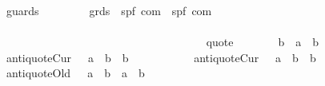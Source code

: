 \begin{isabellebody}
\ \ {\isachardoublequoteopen}{\isacharunderscore}guards{\isachardoublequoteclose}\ \ \ \ \ \ \ \ {\isacharcolon}{\isacharcolon}\ {\isachardoublequoteopen}grds\ {\isasymRightarrow}\ {\isacharparenleft}{\isacharprime}s{\isacharcomma}{\isacharprime}p{\isacharcomma}{\isacharprime}f{\isacharparenright}\ com\ {\isasymRightarrow}\ {\isacharparenleft}{\isacharprime}s{\isacharcomma}{\isacharprime}p{\isacharcomma}{\isacharprime}f{\isacharparenright}\ com{\isachardoublequoteclose}\ \isanewline
\ \ \ \ \ \ \ \ \ \ \ \ \ \ \ \ \ \ \ \ \ \ \ \ \ \ \ \ \ \ \ \ \ \ \ \ \ \ \ \ \ \ \ \ {\isacharparenleft}{\isachardoublequoteopen}{\isacharparenleft}{\isacharunderscore}{\isacharslash}{\isasymlongmapsto}\ {\isacharunderscore}{\isacharparenright}{\isachardoublequoteclose}\ {\isacharbrackleft}{}{}{\isacharcomma}\ {}{}{\isacharbrackright}\ {}{}{\isacharparenright}\ \ \ \ \ \ \ \ \ \ \ \ \ \ \ \ \ \ \ \ \ \ \ \ \ \ \ \ \ \ \ \ \ \ \ \ \ \ \ \ \ \ \ \ \ \ \ \ \ \ \ \ \ \ \ \ \ \ \ \isanewline
\ \ {\isachardoublequoteopen}{\isacharunderscore}quote{\isachardoublequoteclose}\ \ \ \ \ \ \ {\isacharcolon}{\isacharcolon}\ {\isachardoublequoteopen}{\isacharprime}b\ {\isacharequal}{\isachargreater}\ {\isacharparenleft}{\isacharprime}a\ {\isacharequal}{\isachargreater}\ {\isacharprime}b{\isacharparenright}{\isachardoublequoteclose}\isanewline
\ \ {\isachardoublequoteopen}{\isacharunderscore}antiquoteCur{}{\isachardoublequoteclose}\ \ {\isacharcolon}{\isacharcolon}\ {\isachardoublequoteopen}{\isacharparenleft}{\isacharprime}a\ {\isacharequal}{\isachargreater}\ {\isacharprime}b{\isacharparenright}\ {\isacharequal}{\isachargreater}\ {\isacharprime}b{\isachardoublequoteclose}\ \ \ \ \ \ \ {\isacharparenleft}{\isachardoublequoteopen}{\isasymacute}{\isacharunderscore}{\isachardoublequoteclose}\ {\isacharbrackleft}{}{}{}{}{\isacharbrackright}\ {}{}{}{}{\isacharparenright}\isanewline
\ \ {\isachardoublequoteopen}{\isacharunderscore}antiquoteCur{\isachardoublequoteclose}\ \ {\isacharcolon}{\isacharcolon}\ {\isachardoublequoteopen}{\isacharparenleft}{\isacharprime}a\ {\isacharequal}{\isachargreater}\ {\isacharprime}b{\isacharparenright}\ {\isacharequal}{\isachargreater}\ {\isacharprime}b{\isachardoublequoteclose}\isanewline
\ \ {\isachardoublequoteopen}{\isacharunderscore}antiquoteOld{}{\isachardoublequoteclose}\ \ {\isacharcolon}{\isacharcolon}\ {\isachardoublequoteopen}{\isacharparenleft}{\isacharprime}a\ {\isacharequal}{\isachargreater}\ {\isacharprime}b{\isacharparenright}\ {\isacharequal}{\isachargreater}\ {\isacharprime}a\ {\isacharequal}{\isachargreater}\ {\isacharprime}b{\isachardoublequoteclose}\ \ \ \ \ \ \ {\isacharparenleft}{\isachardoublequoteopen}\isactrlbsup {\isacharunderscore}\isactrlesup {\isacharunderscore}{\isachardoublequoteclose}\ {\isacharbrackleft}{}{}{}{}{\isacharcomma}{}{}{}{}{\isacharbrackright}\ {}{}{}{}{\isacharparenright}\isanewline

\end{isabellebody}
